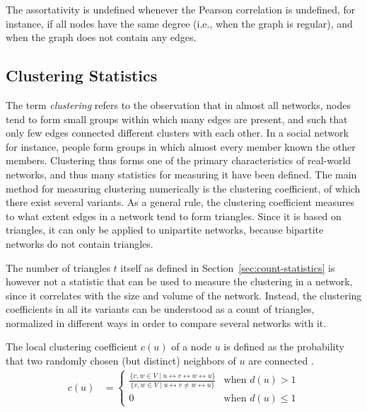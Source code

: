 \documentclass{article}
\begin{document}
The assortativity is
undefined whenever the Pearson correlation is undefined, for instance,
if all nodes have the same degree (i.e., when the graph is regular), and
when the graph does not contain any edges. 

\subsection{Clustering Statistics}
\label{sec:statistic:clustering}

The term \emph{clustering} refers to the observation that in almost all
networks, nodes tend to form small groups within which many edges are
present, and such that only few edges connected different clusters with
each other.  In a social network for instance, people form groups in
which almost every member known the other members.  Clustering thus
forms one of the primary characteristics of real-world networks, and
thus many statistics for measuring it have been defined.  The main
method for measuring clustering numerically is the clustering
coefficient, of which there exist several variants. As a general rule,
the clustering coefficient measures to what extent edges in a network
tend to form triangles. Since it is based on triangles, it can only be
applied to unipartite networks, because bipartite networks do not
contain triangles.

The number of triangles $t$ itself as defined in
Section~\ref{sec:count-statistics} is however not a statistic that can
be used to measure the clustering in a network, since it correlates with
the size and volume of the network.  Instead, the clustering
coefficients in all its variants can be understood as a count of
triangles, normalized in different ways in order to compare several
networks with it.

The local clustering coefficient $c(u)$ of a node $u$ is defined as the
probability that two randomly chosen (but distinct) neighbors of $u$ are
connected \citep{b228}.
\begin{align}
  c(u) &= \left\{ \begin{array}{ll} \frac { \{ v, w \in V \mid u \leftrightarrow v
      \leftrightarrow w \leftrightarrow u \} } { \{ v, w \in V \mid u \leftrightarrow v \neq w \leftrightarrow u \}
    } & \text{when } d(u) > 1 \\ 0 & \text{when } d(u) \leq 1
          \end{array} \right. 
\end{align}
\end{document}

